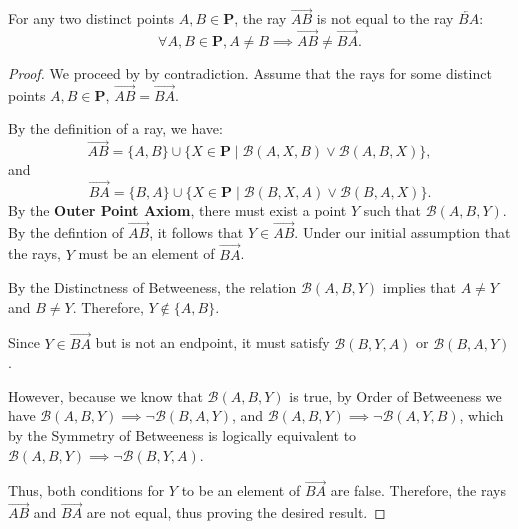 \documentclass[../../../main/main.tex]{subfiles}
\begin{document}
\begin{theorem}
    For any two distinct points $A, B \in \mathbf{P}$, the ray $\overrightarrow{AB}$ is not equal to the ray $\overleftarrow{BA}$:
    \[
    \forall A, B \in \mathbf{P}, A \neq B \implies \overrightarrow{AB} \neq \overrightarrow{BA}.
    \]
\end{theorem}
\begin{proof}
    We proceed by by contradiction. Assume that the rays for some distinct points $A, B \in \mathbf{P}$, $\overrightarrow{AB} = \overrightarrow{BA}$.

    By the definition of a ray, we have:
    \[
    \overrightarrow{AB} = \{A, B\} \cup \{X \in \mathbf{P} \mid \mathcal{B}(A, X, B) \lor \mathcal{B}(A, B, X)\},
    \]
    and
    \[
    \overrightarrow{BA} = \{B, A\} \cup \{X \in \mathbf{P} \mid \mathcal{B}(B, X, A) \lor \mathcal{B}(B, A, X)\}.
    \]
    By the \textbf{Outer Point Axiom}, there must exist a point $Y$ such that $\mathcal{B}(A, B, Y)$. By the defintion of $\overrightarrow{AB}$, it follows that $Y \in \overrightarrow{AB}$. Under our initial assumption that the rays, $Y$ must be an element of $\overrightarrow{BA}$.

    By the Distinctness of Betweeness, the relation $\mathcal{B}(A, B, Y)$ implies that $A \neq Y$ and $B \neq Y$. Therefore, $Y \notin \{A, B\}$.

    Since $Y \in \overrightarrow{BA}$ but is not an endpoint, it must satisfy $\mathcal{B}(B, Y, A)$ or $\mathcal{B}(B, A, Y)$.

    However, because we know that $\mathcal{B}(A, B, Y)$ is true, by Order of Betweeness we have $\mathcal{B}(A, B, Y) \implies \neg \mathcal{B}(B, A, Y)$, and $\mathcal{B}(A, B, Y) \implies \neg \mathcal{B}(A, Y, B)$, which by the Symmetry of Betweeness is logically equivalent to $\mathcal{B}(A, B, Y) \implies \neg \mathcal{B}(B, Y, A)$.

    Thus, both conditions for $Y$ to be an element of $\overrightarrow{BA}$ are false. Therefore, the rays $\overrightarrow{AB}$ and $\overrightarrow{BA}$ are not equal, thus proving the desired result.
\end{proof}
\end{document}
